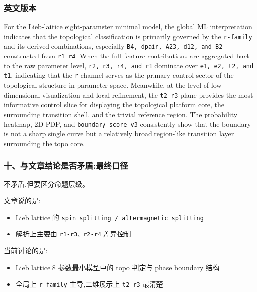\documentclass[lang=cn,scheme=chinese,color=blue,device=normal,toc=onecol,math=cm]{elegantbook}
\begin{document}
\subsubsection{英文版本}


For the Lieb-lattice eight-parameter minimal model, the global ML interpretation indicates that the topological classification is primarily governed by the \texttt{r-family} and its derived combinations, especially \texttt{B4, dpair, A23, d12, and B2} constructed from \texttt{r1-r4}. When the full feature contributions are aggregated back to the raw parameter level, \texttt{r2, r3, r4, and r1} dominate over \texttt{e1, e2, t2, and t1}, indicating that the \texttt{r} channel serves as the primary control sector of the topological structure in parameter space. Meanwhile, at the level of low-dimensional visualization and local refinement, the \texttt{t2-r3} plane provides the most informative control slice for displaying the topological platform core, the surrounding transition shell, and the trivial reference region. The probability heatmap, 2D PDP, and \texttt{boundary\_\allowbreak{}score\_\allowbreak{}v3} consistently show that the boundary is not a sharp single curve but a relatively broad region-like transition layer surrounding the topo core.\par


\subsubsection{十、与文章结论是否矛盾:最终口径}


不矛盾,但要区分命题层级。\par


文章说的是:\par


\begin{itemize}
\item Lieb lattice 的 \texttt{spin splitting /\allowbreak{} altermagnetic splitting}
\item 解析上主要由 \texttt{r1-r3、r2-r4} 差异控制
\end{itemize}


当前讨论的是:\par


\begin{itemize}
\item Lieb lattice 8 参数最小模型中的 topo 判定与 phase boundary 结构
\item 全局上 \texttt{r-family} 主导,二维展示上 \texttt{t2-r3} 最清楚
\end{itemize}
\end{document}

